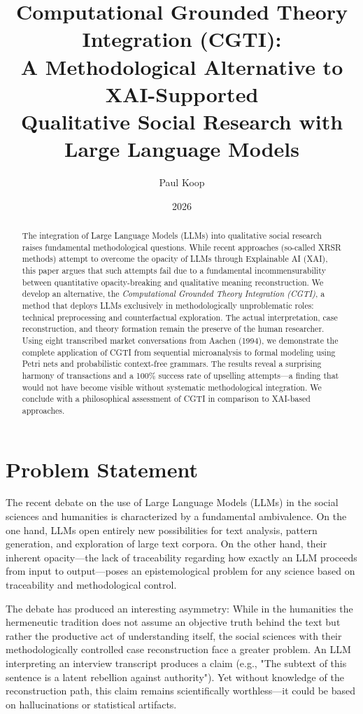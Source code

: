\documentclass[12pt,a4paper]{article}
\title{Computational Grounded Theory Integration (CGTI):\\
A Methodological Alternative to XAI-Supported\\
Qualitative Social Research with Large Language Models}
\author{
  \large
  \begin{tabular}{c}
    Paul Koop
  \end{tabular}
}
\date{\large 2026}
\begin{document}
\maketitle

\begin{abstract}
The integration of Large Language Models (LLMs) into qualitative social research raises fundamental methodological questions. While recent approaches (so-called XRSR methods) attempt to overcome the opacity of LLMs through Explainable AI (XAI), this paper argues that such attempts fail due to a fundamental incommensurability between quantitative opacity-breaking and qualitative meaning reconstruction. We develop an alternative, the \textit{Computational Grounded Theory Integration (CGTI)}, a method that deploys LLMs exclusively in methodologically unproblematic roles: technical preprocessing and counterfactual exploration. The actual interpretation, case reconstruction, and theory formation remain the preserve of the human researcher. Using eight transcribed market conversations from Aachen (1994), we demonstrate the complete application of CGTI from sequential microanalysis to formal modeling using Petri nets and probabilistic context-free grammars. The results reveal a surprising harmony of transactions and a 100\% success rate of upselling attempts—a finding that would not have become visible without systematic methodological integration. We conclude with a philosophical assessment of CGTI in comparison to XAI-based approaches.
\end{abstract}

\section{Problem Statement}

The recent debate on the use of Large Language Models (LLMs) in the social sciences and humanities is characterized by a fundamental ambivalence. On the one hand, LLMs open entirely new possibilities for text analysis, pattern generation, and exploration of large text corpora. On the other hand, their inherent opacity—the lack of traceability regarding how exactly an LLM proceeds from input to output—poses an epistemological problem for any science based on traceability and methodological control.

The debate has produced an interesting asymmetry: While in the humanities the hermeneutic tradition does not assume an objective truth behind the text but rather the productive act of understanding itself, the social sciences with their methodologically controlled case reconstruction face a greater problem. An LLM interpreting an interview transcript produces a claim (e.g., "The subtext of this sentence is a latent rebellion against authority"). Yet without knowledge of the reconstruction path, this claim remains scientifically worthless—it could be based on hallucinations or statistical artifacts.
\end{document}
